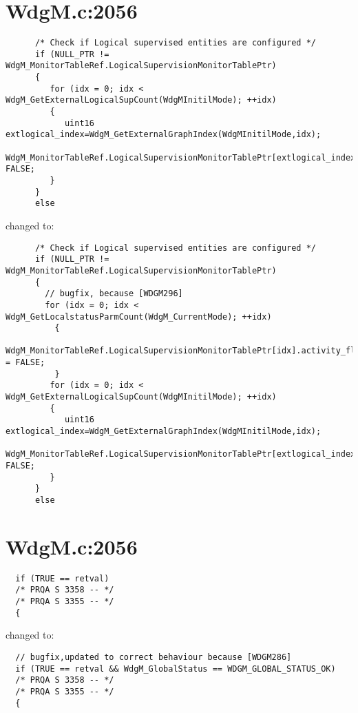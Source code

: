 \documentclass[11pt,a4paper]{article}
\begin{document}
\section{WdgM.c:2056}
\begin{lstlisting}
      /* Check if Logical supervised entities are configured */
      if (NULL_PTR != WdgM_MonitorTableRef.LogicalSupervisionMonitorTablePtr)
      {
         for (idx = 0; idx < WdgM_GetExternalLogicalSupCount(WdgMInitilMode); ++idx)
         {
            uint16 extlogical_index=WdgM_GetExternalGraphIndex(WdgMInitilMode,idx);
            WdgM_MonitorTableRef.LogicalSupervisionMonitorTablePtr[extlogical_index].activity_flag= FALSE;
         }
      }
      else
\end{lstlisting}
changed to:
\begin{lstlisting}
      /* Check if Logical supervised entities are configured */
      if (NULL_PTR != WdgM_MonitorTableRef.LogicalSupervisionMonitorTablePtr)
      {
        // bugfix, because [WDGM296]
        for (idx = 0; idx < WdgM_GetLocalstatusParmCount(WdgM_CurrentMode); ++idx)
          {
            WdgM_MonitorTableRef.LogicalSupervisionMonitorTablePtr[idx].activity_flag = FALSE;
          }
         for (idx = 0; idx < WdgM_GetExternalLogicalSupCount(WdgMInitilMode); ++idx)
         {
            uint16 extlogical_index=WdgM_GetExternalGraphIndex(WdgMInitilMode,idx);
            WdgM_MonitorTableRef.LogicalSupervisionMonitorTablePtr[extlogical_index].activity_flag= FALSE;
         }
      }
      else
\end{lstlisting}

\newpage
\section{WdgM.c:2056}
\begin{lstlisting}
  if (TRUE == retval)
  /* PRQA S 3358 -- */
  /* PRQA S 3355 -- */
  {
\end{lstlisting}
changed to:
\begin{lstlisting}
  // bugfix,updated to correct behaviour because [WDGM286]
  if (TRUE == retval && WdgM_GlobalStatus == WDGM_GLOBAL_STATUS_OK)
  /* PRQA S 3358 -- */
  /* PRQA S 3355 -- */
  {
\end{lstlisting}

\newpage
\end{document}
